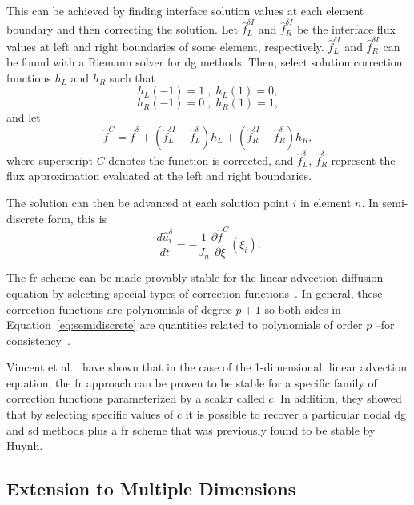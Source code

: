 This can be achieved by finding interface solution values at each element boundary and then correcting the 
solution. Let $\hat{f}_L^{\delta I}$ and $\hat{f}_R^{\delta I}$ be the interface flux values at left and right 
boundaries of some element, respectively. $\hat{f}_L^{\delta I}$ and $\hat{f}_R^{\delta I}$ can be found with a Riemann solver for \gls{dg} methods\cite{hesthaven2007nodal}. Then, select solution correction functions $h_L$ and 
$h_R$ such 
that
\begin{equation}\label{eq:condition}
h_L(-1) = 1 \;,\; h_L(1) = 0,
\end{equation}
\begin{equation}
h_R(-1) = 0 \;,\; h_R(1) = 1,
\end{equation}
and let
\begin{equation}
\hat{f}^C = \hat{f}^\delta + (\hat{f}^{\delta I}_L - \hat{f}^\delta_L) h_L + (\hat{f}^{\delta I}_R 
- \hat{f}^\delta_R) h_R,
\end{equation}
where superscript $C$ denotes the function is corrected, and $\hat{f}^\delta_L$, $\hat{f}^\delta_R$ 
represent the flux approximation evaluated at the left and right boundaries.

The solution can then be advanced at each solution point $i$ in element $n$. In semi-discrete form, this is
\begin{equation}\label{eq:semidiscrete}
\frac{d \hat{u}_i^\delta}{d t} = - \frac{1}{J_n}\frac{\partial \hat{f}^C}{\partial \xi}(\xi_i).
\end{equation}

The \gls{fr} scheme can be made provably stable for the linear advection-diffusion equation by selecting special types of correction functions~\cite{castonguay2013energy}. In general, these correction functions are polynomials of degree $p+1$ so both sides in Equation~\eqref{eq:semidiscrete} are quantities related to polynomials of order $p$ --for consistency~\cite{huynh2007flux}.

Vincent et al.~\cite{vincent2011new} have shown that in the case of the 1-dimensional, linear advection equation, the \gls{fr} approach can be proven to be stable for a specific family of correction functions parameterized by a scalar called $c$. In addition, they showed that by selecting specific values of $c$ it is possible to recover a particular nodal \gls{dg} and \gls{sd} methods plus a \gls{fr} scheme that was previously found to be stable by Huynh\cite{huynh2007flux}.

\subsection{Extension to Multiple Dimensions}

